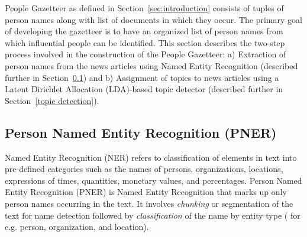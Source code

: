 People Gazetteer as defined in Section~\ref{sec:introduction} consists of tuples of person names along with list of documents in which they occur. The primary goal of developing the gazetteer is to have an organized list of person names from which influential people can be identified.
This section describes the two-step process involved in the construction of the People Gazetteer:
a) Extraction of person names from the news articles using Named Entity Recognition (described further in Section~\ref{ner}) and
b) Assignment of topics to news articles using a Latent Dirichlet Allocation (LDA)-based topic detector (described further in  Section~\ref{topic detection}).

\subsection{Person Named Entity Recognition (PNER)}
\label{ner}

\noindent Named Entity Recognition (NER) refers to classification of elements in text into pre-defined categories such as the names of persons, organizations, locations, expressions of times, quantities, monetary values, and percentages. 
Person Named Entity Recognition (PNER) is Named Entity Recognition that marks up only person names occurring in the text. It involves \emph{chunking} or segmentation of  the text for name detection followed by \emph{classification} of the name by entity type ( for e.g. person, organization, and location).


